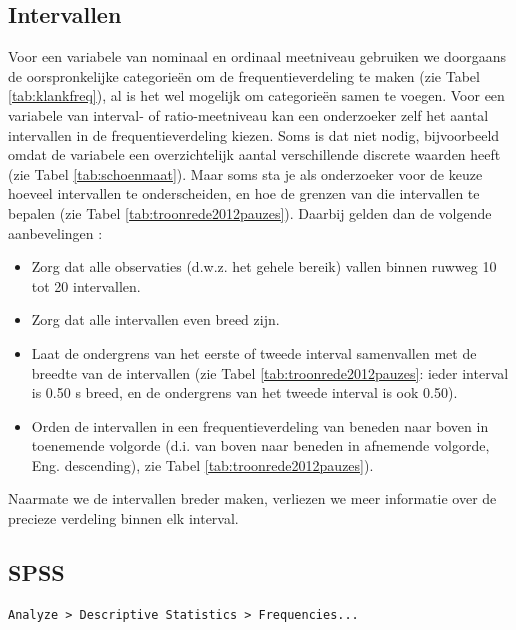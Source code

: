 \documentclass[
]{book}
\begin{document}
\hypertarget{sec:intervallen}{%
\subsection{Intervallen}\label{sec:intervallen}}

Voor een variabele van nominaal en ordinaal meetniveau gebruiken we
doorgaans de oorspronkelijke categorieën om de frequentieverdeling te
maken (zie Tabel \ref{tab:klankfreq}), al is het wel mogelijk om categorieën samen
te voegen. Voor een variabele van interval- of ratio-meetniveau kan een
onderzoeker zelf het aantal intervallen in de frequentieverdeling
kiezen. Soms is dat niet nodig, bijvoorbeeld omdat de variabele een
overzichtelijk aantal verschillende discrete waarden heeft (zie
Tabel \ref{tab:schoenmaat}). Maar soms sta je als onderzoeker
voor de keuze hoeveel intervallen te onderscheiden, en hoe de grenzen
van die intervallen te bepalen (zie Tabel \ref{tab:troonrede2012pauzes}).
Daarbij gelden dan de volgende aanbevelingen \citep[Ch.2]{Ferg89}:

\begin{itemize}
\item
  Zorg dat alle observaties (d.w.z. het gehele bereik) vallen binnen
  ruwweg 10 tot 20 intervallen.
\item
  Zorg dat alle intervallen even breed zijn.
\item
  Laat de ondergrens van het eerste of tweede interval samenvallen met
  de breedte van de intervallen (zie
  Tabel \ref{tab:troonrede2012pauzes}: ieder interval is 0.50 s
  breed, en de ondergrens van het tweede interval is ook 0.50).
\item
  Orden de intervallen in een frequentieverdeling van beneden naar
  boven in toenemende volgorde (d.i. van boven naar beneden in
  afnemende volgorde, Eng. descending), zie
  Tabel \ref{tab:troonrede2012pauzes}).
\end{itemize}

Naarmate we de intervallen breder maken, verliezen we meer informatie
over de precieze verdeling binnen elk interval.

\hypertarget{spss-1}{%
\subsection{SPSS}\label{spss-1}}

\begin{verbatim}
Analyze > Descriptive Statistics > Frequencies...
\end{verbatim}
\end{document}
